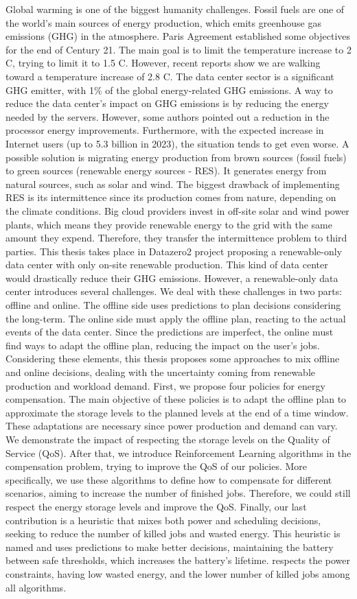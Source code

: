 \vspace{-0.7cm}
Global warming is one of the biggest humanity challenges. Fossil fuels are one of the world's main sources of energy production, which emits greenhouse gas emissions (GHG) in the atmosphere. Paris Agreement established some objectives for the end of Century 21. The main goal is to limit the temperature increase to 2 \degree C, trying to limit it to 1.5 \degree C. However, recent reports show we are walking toward a temperature increase of 2.8 \degree C. The data center sector is a significant GHG emitter, with 1\% of the global energy-related GHG emissions. A way to reduce the data center's impact on GHG emissions is by reducing the energy needed by the servers. However, some authors pointed out a reduction in the processor energy improvements. Furthermore, with the expected increase in Internet users (up to 5.3 billion in 2023), the situation tends to get even worse. A possible solution is migrating energy production from brown sources (fossil fuels) to green sources (renewable energy sources - RES). It generates energy from natural sources, such as solar and wind. The biggest drawback of implementing RES is its intermittence since its production comes from nature, depending on the climate conditions. Big cloud providers invest in off-site solar and wind power plants, which means they provide renewable energy to the grid with the same amount they expend. Therefore, they transfer the intermittence problem to third parties. This thesis takes place in Datazero2 project proposing a renewable-only data center with only on-site renewable production. This kind of data center would drastically reduce their GHG emissions. However, a renewable-only data center introduces several challenges. We deal with these challenges in two parts: offline and online. The offline side uses predictions to plan decisions considering the long-term. The online side must apply the offline plan, reacting to the actual events of the data center. Since the predictions are imperfect, the online must find ways to adapt the offline plan, reducing the impact on the user's jobs. Considering these elements, this thesis proposes some approaches to mix offline and online decisions, dealing with the uncertainty coming from renewable production and workload demand. First, we propose four policies for energy compensation. The main objective of these policies is to adapt the offline plan to approximate the storage levels to the planned levels at the end of a time window. These adaptations are necessary since power production and demand can vary. We demonstrate the impact of respecting the storage levels on the Quality of Service (QoS). After that, we introduce Reinforcement Learning algorithms in the compensation problem, trying to improve the QoS of our policies. More specifically, we use these algorithms to define how to compensate for different scenarios, aiming to increase the number of finished jobs. Therefore, we could still respect the energy storage levels and improve the QoS. Finally, our last contribution is a heuristic that mixes both power and scheduling decisions, seeking to reduce the number of killed jobs and wasted energy. This heuristic is named \emph{\systemName} and uses predictions to make better decisions, maintaining the battery between safe thresholds, which increases the battery's lifetime. \emph{\systemName} respects the power constraints, having low wasted energy, and the lower number of killed jobs among all algorithms.